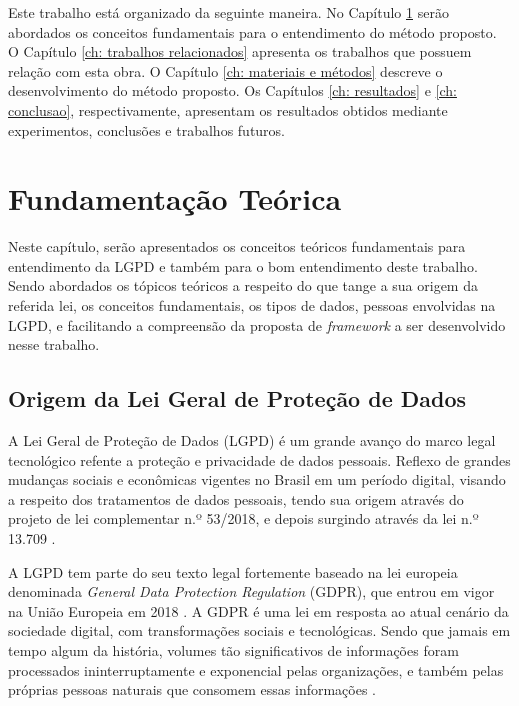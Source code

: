 \documentclass[
	12pt,				%
	openright,			%
	oneside,			%
	a4paper,			%
	english,			%
	french,				%
	spanish,			%
	brazil,				%
	]{abntex2}
\begin{document}
Este trabalho está organizado da seguinte maneira. No Capítulo \ref{ch: fundamentacao teorica} serão abordados os conceitos fundamentais para o entendimento do método proposto. O Capítulo \ref{ch: trabalhos relacionados} apresenta os trabalhos que possuem relação com esta obra. O Capítulo \ref{ch: materiais e métodos} descreve o desenvolvimento do método proposto. Os Capítulos \ref{ch: resultados} e \ref{ch: conclusao}, respectivamente, apresentam os resultados obtidos mediante experimentos, conclusões e trabalhos futuros.


\setcounter{chapter}{1}
\chapter{Fundamentação Teórica}
\label{ch: fundamentacao teorica}


Neste capítulo, serão apresentados os conceitos teóricos fundamentais para entendimento da LGPD e também para o bom entendimento deste trabalho. Sendo abordados os tópicos teóricos a respeito do que tange a sua origem da referida lei, os conceitos fundamentais, os tipos de dados, pessoas envolvidas na LGPD, e facilitando a compreensão da proposta de \textit{framework} a ser desenvolvido nesse trabalho.
\section{Origem da Lei Geral de Proteção de Dados }
\label{sec: exemplo}

A Lei Geral de Proteção de Dados (LGPD) é  um grande avanço do marco legal tecnológico refente a proteção e privacidade de dados pessoais. Reflexo de grandes mudanças sociais e econômicas vigentes no Brasil em um período digital, visando a respeito dos tratamentos de dados pessoais, tendo sua origem através do projeto de lei complementar n.º 53/2018, e depois surgindo através da lei n.º 13.709 \cite{01-01-LeiGeral}. 

A LGPD tem parte do seu texto legal fortemente baseado na lei europeia denominada \textit{General Data Protection Regulation} (GDPR), que entrou em vigor na União Europeia em 2018 \cite{02-01-Redecker2021}. A GDPR é uma lei em resposta ao atual cenário da sociedade digital, com transformações sociais e tecnológicas. Sendo que jamais em tempo algum da história, volumes tão significativos de informações foram processados ininterruptamente e exponencial pelas organizações, e também pelas próprias pessoas naturais que consomem essas informações \cite{02-01-Vainzof2020}.
\end{document}
